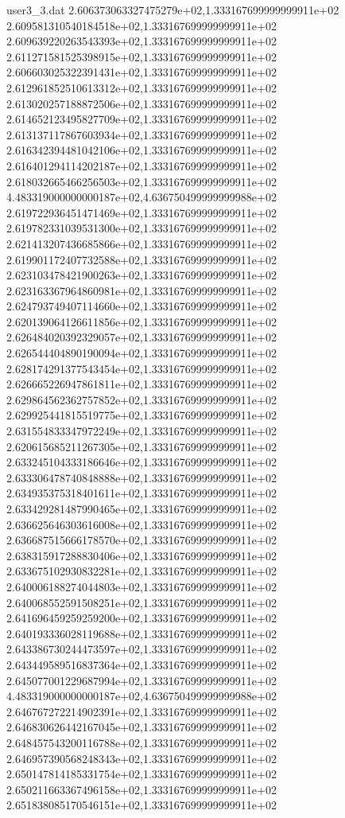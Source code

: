 \begin{filecontents}{user3_3.dat}
2.606373063327475279e+02,1.333167699999999911e+02
2.609581310540184518e+02,1.333167699999999911e+02
2.609639220263543393e+02,1.333167699999999911e+02
2.611271581525398915e+02,1.333167699999999911e+02
2.606603025322391431e+02,1.333167699999999911e+02
2.612961852510613312e+02,1.333167699999999911e+02
2.613020257188872506e+02,1.333167699999999911e+02
2.614652123495827709e+02,1.333167699999999911e+02
2.613137117867603934e+02,1.333167699999999911e+02
2.616342394481042106e+02,1.333167699999999911e+02
2.616401294114202187e+02,1.333167699999999911e+02
2.618032665466256503e+02,1.333167699999999911e+02
4.483319000000000187e+02,4.636750499999999988e+02
2.619722936451471469e+02,1.333167699999999911e+02
2.619782331039531300e+02,1.333167699999999911e+02
2.621413207436685866e+02,1.333167699999999911e+02
2.619901172407732588e+02,1.333167699999999911e+02
2.623103478421900263e+02,1.333167699999999911e+02
2.623163367964860981e+02,1.333167699999999911e+02
2.624793749407114660e+02,1.333167699999999911e+02
2.620139064126611856e+02,1.333167699999999911e+02
2.626484020392329057e+02,1.333167699999999911e+02
2.626544404890190094e+02,1.333167699999999911e+02
2.628174291377543454e+02,1.333167699999999911e+02
2.626665226947861811e+02,1.333167699999999911e+02
2.629864562362757852e+02,1.333167699999999911e+02
2.629925441815519775e+02,1.333167699999999911e+02
2.631554833347972249e+02,1.333167699999999911e+02
2.620615685211267305e+02,1.333167699999999911e+02
2.633245104333186646e+02,1.333167699999999911e+02
2.633306478740848888e+02,1.333167699999999911e+02
2.634935375318401611e+02,1.333167699999999911e+02
2.633429281487990465e+02,1.333167699999999911e+02
2.636625646303616008e+02,1.333167699999999911e+02
2.636687515666178570e+02,1.333167699999999911e+02
2.638315917288830406e+02,1.333167699999999911e+02
2.633675102930832281e+02,1.333167699999999911e+02
2.640006188274044803e+02,1.333167699999999911e+02
2.640068552591508251e+02,1.333167699999999911e+02
2.641696459259259200e+02,1.333167699999999911e+02
2.640193336028119688e+02,1.333167699999999911e+02
2.643386730244473597e+02,1.333167699999999911e+02
2.643449589516837364e+02,1.333167699999999911e+02
2.645077001229687994e+02,1.333167699999999911e+02
4.483319000000000187e+02,4.636750499999999988e+02
2.646767272214902391e+02,1.333167699999999911e+02
2.646830626442167045e+02,1.333167699999999911e+02
2.648457543200116788e+02,1.333167699999999911e+02
2.646957390568248343e+02,1.333167699999999911e+02
2.650147814185331754e+02,1.333167699999999911e+02
2.650211663367496158e+02,1.333167699999999911e+02
2.651838085170546151e+02,1.333167699999999911e+02

\end{filecontents}
